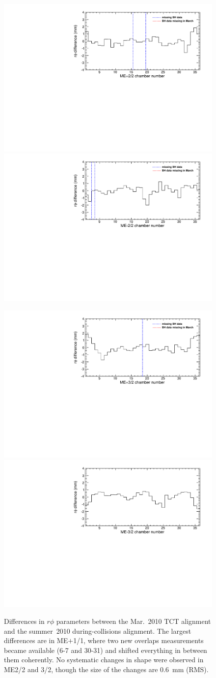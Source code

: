 \documentclass[12pt]{article}
\begin{document}
\begin{figure}
\begin{center}
\includegraphics[width=0.45\linewidth]{TCTtoCollisions_mep22.pdf}
\includegraphics[width=0.45\linewidth]{TCTtoCollisions_mem22.pdf}

\includegraphics[width=0.45\linewidth]{TCTtoCollisions_mep32.pdf}
\includegraphics[width=0.45\linewidth]{TCTtoCollisions_mem32.pdf}
\end{center}

\caption{Differences in $r\phi$ parameters between the Mar.~2010 TCT
  alignment and the summer~2010 during-collisions alignment.  The
  largest differences are in ME$+$1/1, where two new overlaps
  measurements became available (6-7 and 30-31) and shifted
  everything in between them coherently.  No systematic changes in
  shape were observed in ME2/2 and 3/2, though the size of the
  changes are 0.6~mm (RMS). \label{fig:TCTtoCollisions_histograms}}
\end{figure}
\end{document}
